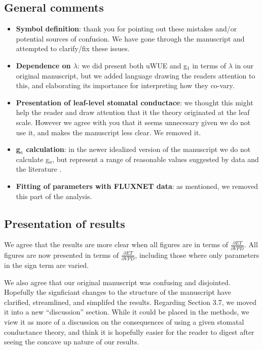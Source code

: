 \documentclass[12pt]{article}
\begin{document}
\subsection{General comments}

\begin{itemize}
  \item \textbf{Symbol definition}: thank you for pointing out these mistakes
    and/or potential sources of confusion. We have gone through the
    manuscript and attempted to clarify/fix these issues.
  \item \textbf{Dependence on $\lambda$}: we did present both uWUE and g$_1$ in
    terms of $\lambda$ in our original manuscript, but we added
    language drawing the readers attention to this, and elaborating
    its importance for interpreting how they co-vary.
  \item \textbf{Presentation of leaf-level stomatal conductace}: we thought
    this might help the reader and draw attention that it the theory
    originated at the leaf scale. However we agree with you that it
    seems unnecesary given we do not use it, and makes the manuscript
    less clear. We removed it.
  \item \textbf{g$_a$ calculation}: in the newer idealized version of
    the manuscript we do not calculate g$_a$, but represent a range of
    reasonable values suggested by data and the literature
    \citep[e.g.,][]{Raupach_1995}.
  \item \textbf{Fitting of parameters with FLUXNET data}: as
    mentioned, we removed this part of the analysis.
\end{itemize}

\subsection{Presentation of results}

We agree that the results are more clear when all figures are in terms
of $\frac{\partial ET}{\partial VPD}$. All figures are now presented
in terms of $\frac{\partial ET}{\partial VPD}$, including those where
only parameters in the sign term are varied.

We also agree that our original manuscript was confusing and
disjointed. Hopefully the signficiant changes to the structure of the
manuscript have clarified, streamlined, and simplifed the
results. Regarding Section 3.7, we moved it into a new ``discussion''
section. While it could be placed in the methods, we view it as more
of a discussion on the consequences of using a given stomatal
conductance theory, and think it is hopefully easier for the reader to
digest after seeing the concave up nature of our results.
\end{document}
